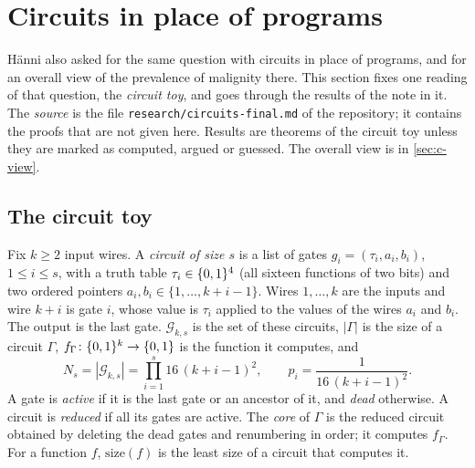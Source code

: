 \section{Circuits in place of programs}\label{sec:circuits}
\providecommand{\cG}{\mathcal G}\providecommand{\ctt}{\mathrm{tt}}\providecommand{\csize}{\mathrm{size}}
\providecommand{\ccore}{\mathrm{core}}\providecommand{\cdec}{\mathrm{Dec}}\providecommand{\cmux}{\mathrm{mux}}

H\"anni also asked for the same question with circuits in place of programs, and for an overall view of the
prevalence of malignity there. This section fixes one reading of that question, the \emph{circuit toy}, and
goes through the results of the note in it. The \emph{source} is the file \texttt{research/circuits-final.md}
of the repository; it contains the proofs that are not given here. Results are theorems of the circuit toy
unless they are marked as computed, argued or guessed. The overall view is in \cref{sec:c-view}.

\subsection{The circuit toy}

\begin{definition}[Circuits]\label{def:c-circuit}
Fix $k\ge2$ input wires. A \emph{circuit of size $s$} is a list of gates $g_i=(\tau_i,a_i,b_i)$,
$1\le i\le s$, with a truth table $\tau_i\in\{0,1\}^4$ (all sixteen functions of two bits) and two ordered pointers
$a_i,b_i\in\{1,\dots,k+i-1\}$. Wires $1,\dots,k$ are the inputs and wire $k+i$ is gate $i$, whose value is
$\tau_i$ applied to the values of the wires $a_i$ and $b_i$. The output is the last gate. $\cG_{k,s}$ is the
set of these circuits, $|\Gamma|$ is the size of a circuit $\Gamma$, $f_\Gamma\colon\{0,1\}^k\to\{0,1\}$ is the function
it computes, and
\[
N_s=|\cG_{k,s}|=\prod_{i=1}^{s}16\,(k+i-1)^2,\qquad p_i=\frac1{16\,(k+i-1)^2}.
\]
A gate is \emph{active} if it is the last gate or an ancestor of it, and \emph{dead} otherwise. A circuit is
\emph{reduced} if all its gates are active. The \emph{core} of $\Gamma$ is the reduced circuit obtained by
deleting the dead gates and renumbering in order; it computes $f_\Gamma$. For a function $f$, $\csize(f)$ is
the least size of a circuit that computes it.
\end{definition}

